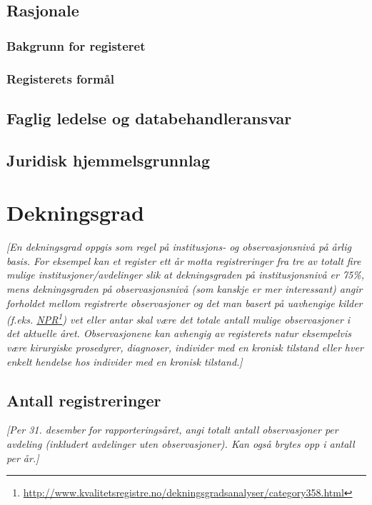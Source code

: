 \documentclass[norsk, a4paper, twocolumn]{report}
\newcommand{\guide}[1] {
	\textit{[\textcolor{guidegray}{#1}]}
	}
\begin{document}
\section{Rasjonale}
\subsection{Bakgrunn for registeret}\label{sec:bak}
\subsection{Registerets formål}\label{sec:for}

\section{Faglig ledelse og databehandleransvar}\label{cha:led}
\section{Juridisk hjemmelsgrunnlag}\label{cha:jur}


\chapter{Dekningsgrad}\label{cha:dek}
\guide{En dekningsgrad oppgis som regel på institusjons- og observasjonsnivå på 
årlig basis. For eksempel kan et register ett år motta registreringer fra tre
av totalt fire mulige institusjoner/avdelinger slik at dekningsgraden på
institusjonsnivå er 75\%, mens dekningsgraden på observasjonsnivå 
(som kanskje er mer interessant) angir
forholdet mellom registrerte observasjoner og det man basert på uavhengige
kilder (f.eks.
\href{http://www.kvalitetsregistre.no/dekningsgradsanalyser/category358.html}
{NPR}\footnote{\url{http://www.kvalitetsregistre.no/dekningsgradsanalyser/category358.html}})
vet eller antar skal være det totale antall mulige
observasjoner i det aktuelle året. Observasjonene kan avhengig av registerets
natur eksempelvis være kirurgiske prosedyrer, diagnoser, individer med en 
kronisk tilstand eller hver enkelt hendelse hos individer med en kronisk
tilstand.}

\section{Antall registreringer}\label{sec:reg}
\guide{Per 31. desember for rapporteringsåret, angi totalt antall
observasjoner per avdeling (inkludert avdelinger uten observasjoner). Kan
også brytes opp i antall per år.}
\end{document}
